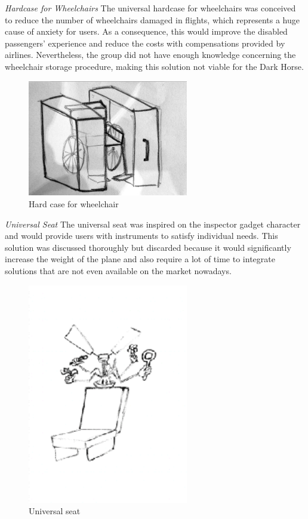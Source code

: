 \emph{Hardcase for Wheelchairs} The universal hardcase for wheelchairs was conceived to reduce the number of wheelchairs damaged in flights, which represents a huge cause of anxiety for users. As a consequence, this would improve the disabled passengers’ experience and reduce the costs with compensations provided by airlines. Nevertheless, the group did not have enough knowledge concerning the wheelchair storage procedure, making this solution not viable for the Dark Horse. \\


\begin{figure}[h]
\centering
\includegraphics[width=7cm]{brazil_images/image008.jpg}
\caption{Hard case for wheelchair}
\label{fig:hardcase}
\end{figure}


\emph{Universal Seat} The universal seat was inspired on the inspector gadget character and would provide users with instruments to satisfy individual needs. This solution was discussed thoroughly but discarded because it would significantly increase the weight of the plane and also require a lot of time to integrate solutions that are not even available on the market nowadays. 

\begin{figure}[h]
\centering
\includegraphics[width=7cm]{brazil_images/image009.png}
\caption{Universal seat}
\label{fig:universal_seat}
\end{figure}


